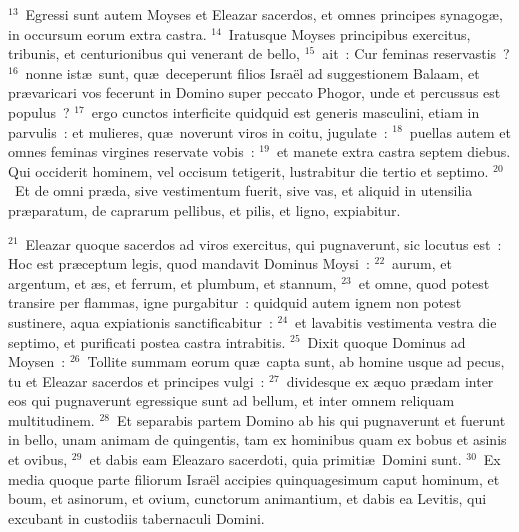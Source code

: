 ${}^{13}$~Egressi sunt autem Moyses et Eleazar sacerdos, et omnes principes synagog\ae , in occursum eorum extra castra.
${}^{14}$~Iratusque Moyses principibus exercitus, tribunis, et centurionibus qui venerant de bello,
${}^{15}$~ait~: Cur feminas reservastis~?
${}^{16}$~nonne ist\ae\ sunt, qu\ae\ deceperunt filios Isra\"el ad suggestionem Balaam, et pr\ae varicari vos fecerunt in Domino super peccato Phogor, unde et percussus est populus~?
${}^{17}$~ergo cunctos interficite quidquid est generis masculini, etiam in parvulis~: et mulieres, qu\ae\ noverunt viros in coitu, jugulate~:
${}^{18}$~puellas autem et omnes feminas virgines reservate vobis~:
${}^{19}$~et manete extra castra septem diebus. Qui occiderit hominem, vel occisum tetigerit, lustrabitur die tertio et septimo.
${}^{20}$~Et de omni pr\ae da, sive vestimentum fuerit, sive vas, et aliquid in utensilia pr\ae paratum, de caprarum pellibus, et pilis, et ligno, expiabitur.


${}^{21}$~Eleazar quoque sacerdos ad viros exercitus, qui pugnaverunt, sic locutus est~: Hoc est pr\ae ceptum legis, quod mandavit Dominus Moysi~:
${}^{22}$~aurum, et argentum, et \ae s, et ferrum, et plumbum, et stannum,
${}^{23}$~et omne, quod potest transire per flammas, igne purgabitur~: quidquid autem ignem non potest sustinere, aqua expiationis sanctificabitur~:
${}^{24}$~et lavabitis vestimenta vestra die septimo, et purificati postea castra intrabitis.
${}^{25}$~Dixit quoque Dominus ad Moysen~:
${}^{26}$~Tollite summam eorum qu\ae\ capta sunt, ab homine usque ad pecus, tu et Eleazar sacerdos et principes vulgi~:
${}^{27}$~dividesque ex \ae quo pr\ae dam inter eos qui pugnaverunt egressique sunt ad bellum, et inter omnem reliquam multitudinem.
${}^{28}$~Et separabis partem Domino ab his qui pugnaverunt et fuerunt in bello, unam animam de quingentis, tam ex hominibus quam ex bobus et asinis et ovibus,
${}^{29}$~et dabis eam Eleazaro sacerdoti, quia primiti\ae\ Domini sunt.
${}^{30}$~Ex media quoque parte filiorum Isra\"el accipies quinquagesimum caput hominum, et boum, et asinorum, et ovium, cunctorum animantium, et dabis ea Levitis, qui excubant in custodiis tabernaculi Domini.


